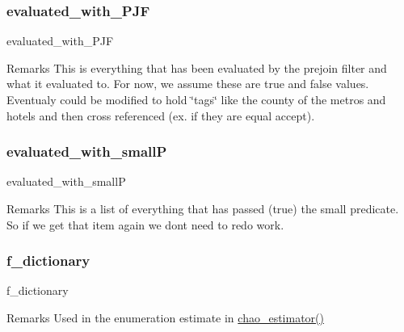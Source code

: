 \subsubsection{\texorpdfstring{evaluated\_with\_PJF}{evaluated\_with\_PJF}}
{\footnotesize\ttfamily evaluated\+\_\+with\+\_\+\+P\+JF}

\begin{DoxyRemark}{Remarks}
This is everything that has been evaluated by the prejoin filter and what it evaluated to. For now, we assume these are true and false values. Eventualy could be modified to hold \char`\"{}tags\char`\"{} like the county of the metros and hotels and then cross referenced (ex. if they are equal accept). 
\end{DoxyRemark}
\mbox{\label{classdynamicfilterapp_1_1models_1_1_join_a4901624b7cab629d3dc4b847438d8e2c}} 
\subsubsection{\texorpdfstring{evaluated\_with\_smallP}{evaluated\_with\_smallP}}
{\footnotesize\ttfamily evaluated\+\_\+with\+\_\+smallP}

\begin{DoxyRemark}{Remarks}
This is a list of everything that has passed (true) the small predicate. So if we get that item again we don\textquotesingle{}t need to redo work. 
\end{DoxyRemark}
\mbox{\label{classdynamicfilterapp_1_1models_1_1_join_a55d12c69a729e82e3244bc2e3285f897}} 
\subsubsection{\texorpdfstring{f\_dictionary}{f\_dictionary}}
{\footnotesize\ttfamily f\+\_\+dictionary}

\begin{DoxyRemark}{Remarks}
Used in the enumeration estimate in \mbox{\hyperlink{classdynamicfilterapp_1_1models_1_1_join_a582efaf16c8455e890ef61101a863966}{chao\+\_\+estimator()}} 
\end{DoxyRemark}
\mbox{\label{classdynamicfilterapp_1_1models_1_1_join_a0a3daf8f0ab00c2b597cea2fecdaa877}} 
